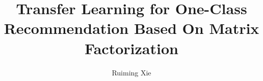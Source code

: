 \documentclass{ustthesis}
\title{Transfer Learning for One-Class Recommendation Based On Matrix Factorization}  %
\author{Ruiming Xie}     %
\numberwithin{definition}{chapter}
\begin{document}

\maketitle

%


\acknowledgments


\end{document}
